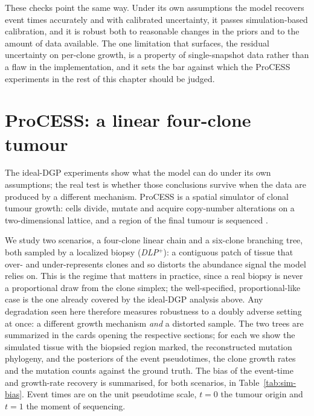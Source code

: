These checks point the same way. Under its own assumptions the
model recovers event times accurately and with calibrated uncertainty, it passes
simulation-based calibration, and it is robust both to reasonable changes in the
priors and to the amount of data available. The one limitation that surfaces, the
residual uncertainty on per-clone growth, is a property of single-snapshot data
rather than a flaw in the implementation, and it sets the bar against which the
ProCESS experiments in the rest of this chapter should be judged.
\section{ProCESS: a linear four-clone tumour}

The ideal-DGP experiments show what the model can do under its own assumptions; the
real test is whether those conclusions survive when the data are produced by a
different mechanism. ProCESS is a spatial simulator of clonal tumour growth: cells
divide, mutate and acquire copy-number alterations on a two-dimensional lattice, and
a region of the final tumour is sequenced \parencite{process}.

We study two scenarios, a four-clone linear chain and a six-clone
branching tree, both sampled by a localized biopsy (\emph{DLP$^+$}): a
contiguous patch of tissue that over- and under-represents clones and so distorts the
abundance signal the model relies on. This is the regime that matters in practice,
since a real biopsy is never a proportional draw from the clone simplex; the
well-specified, proportional-like case is the one already covered by the ideal-DGP
analysis above. Any degradation seen here therefore measures robustness to a doubly
adverse setting at once: a different growth mechanism \emph{and} a distorted sample.
The two trees are summarized in the cards opening the respective sections; for each we
show the simulated tissue with the biopsied region marked, the reconstructed mutation
phylogeny, and the posteriors of the event pseudotimes, the clone growth rates and the
mutation counts against the ground truth. The bias of the event-time and growth-rate
recovery is summarised, for both scenarios, in Table~\ref{tab:sim-bias}. Event times
are on the unit pseudotime scale, $t=0$ the tumour origin and $t=1$ the moment of
sequencing.

